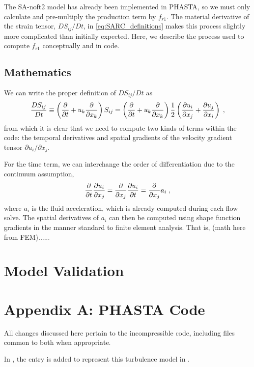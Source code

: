 \documentclass[11pt]{article}
\begin{document}
The SA-noft2 model has already been implemented in PHASTA, so we must only calculate and pre-multiply the production term by $f_{r1}$. The material derivative of the strain tensor, $DS_{ij}/Dt$, in \eqref{eq:SARC_definitions} makes this process slightly more complicated than initially expected. Here, we describe the process used to compute $f_{r1}$ conceptually and in code.

\subsection{Mathematics}

We can write the proper definition of $DS_{ij}/Dt$ as
\begin{equation}
\frac{DS_{ij}}{Dt}
\equiv
\left( \frac{\partial}{\partial t} + u_k \frac{\partial}{\partial x_k} \right) S_{ij}
=
\left( \frac{\partial}{\partial t} + u_k \frac{\partial}{\partial x_k} \right)
\frac{1}{2} \left( \frac{\partial u_i}{\partial x_j} + \frac{\partial u_j}{\partial x_i} \right)
\;,
\end{equation}
from which it is clear that we need to compute two kinds of terms within the code: the temporal derivatives and spatial gradients of the velocity gradient tensor $\partial u_i / \partial x_j$.

For the time term, we can interchange the order of differentiation due to the continuum assumption,
\begin{equation}
\frac{\partial}{\partial t} \frac{\partial u_i}{\partial x_j}
=
\frac{\partial}{\partial x_j} \frac{\partial u_i}{\partial t}
=
\frac{\partial}{\partial x_j} a_i
\;,
\end{equation}
where $a_i$ is the fluid acceleration, which is already computed during each flow solve. The spatial derivatives of $a_i$ can then be computed using shape function gradients in the manner standard to finite element analysis. That is, (math here from FEM)......

\section{Model Validation} %

\section*{Appendix A: PHASTA Code} %

All changes discussed here pertain to the incompressible code, including files common to both when appropriate.

In , the entry  is added to represent this turbulence model in .




\end{document}
